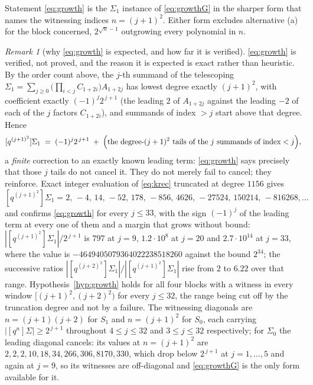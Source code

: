 \documentclass[11pt]{article}
\theoremstyle{plain}
\theoremstyle{definition}
\theoremstyle{remark}
\newtheorem{remark}[theorem]{Remark}
\begin{document}
\noindent Statement \eqref{eq:growth} is the $\Sigma_1$ instance of \eqref{eq:growthG} in the
sharper form that names the witnessing indices $n=(j+1)^2$. Either form excludes alternative
\textup{(a)} for the block concerned, $2^{\sqrt n-1}$ outgrowing every polynomial in $n$.

\begin{remark}[why \eqref{eq:growth} is expected, and how far it is verified]\label{rem:growthstatus}
\eqref{eq:growth} is verified, not proved, and the reason it is expected is exact rather than
heuristic. By the order count above, the $j$-th summand of the telescoping
$\Sigma_1=\sum_{j\ge0}\bigl(\prod_{i<j}C_{1+2i}\bigr)A_{1+2j}$ has lowest degree exactly $(j+1)^2$,
with coefficient exactly $(-1)^j2^{\,j+1}$ (the leading $2$ of $A_{1+2j}$ against the leading $-2$
of each of the $j$ factors $C_{1+2i}$), and summands of index $>j$ start above that degree.
Hence
\[
   [q^{(j+1)^2}]\Sigma_1\;=\;(-1)^j2^{\,j+1}\;+\;\Bigl(\text{the degree-}(j+1)^2\text{ tails of the
   $j$ summands of index}<j\Bigr),
\]
a \emph{finite} correction to an exactly known leading term: \eqref{eq:growth} says precisely that
those $j$ tails do not cancel it. They do not merely fail to cancel; they reinforce. Exact integer
evaluation of \eqref{eq:krec} truncated at degree $1156$ gives
\[
   [q^{(j+1)^2}]\Sigma_1=2,\,-4,\,14,\,-52,\,178,\,-856,\,4626,\,-27524,\,150214,\,-816268,\dots
\]
and confirms \eqref{eq:growth} for every $j\le33$, with the sign $(-1)^j$ of the leading term at
every one of them and a margin that grows without bound: $|[q^{(j+1)^2}]\Sigma_1|/2^{\,j+1}$ is
$797$ at $j=9$, $1.2\cdot10^8$ at $j=20$ and $2.7\cdot10^{14}$ at $j=33$, where the value is
$-4649405079364022238518260$ against the bound $2^{34}$; the successive ratios
$|[q^{(j+2)^2}]\Sigma_1|/|[q^{(j+1)^2}]\Sigma_1|$ rise from $2$ to $6.22$ over that range.
Hypothesis~\ref{hyp:growth} holds for all four blocks with a witness in every window
$[(j+1)^2,(j+2)^2)$ for every $j\le32$, the range being cut off by the truncation degree and not by
a failure. The witnessing diagonals are $n=(j+1)(j+2)$ for $S_1$ and $n=(j+1)^2$ for $S_0$, each
carrying $|[q^n]\Sigma|\ge2^{\,j+1}$ throughout $4\le j\le32$ and $3\le j\le32$ respectively; for
$\Sigma_0$ the leading diagonal cancels: its values at $n=(j+1)^2$ are
$2,2,2,10,18,34,266,306,8170,330$, which drop below $2^{\,j+1}$ at $j=1,\dots,5$ and again at
$j=9$, so its witnesses are off-diagonal and \eqref{eq:growthG} is the only form available for it.


\end{remark}
\end{document}
